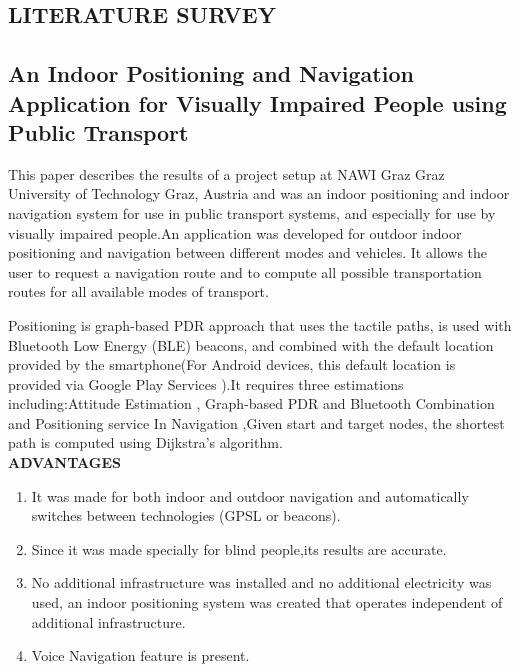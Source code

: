 ﻿\documentclass[a4paper, 12pt]{article}
\begin{document}
\begin{center}

\section{LITERATURE SURVEY}

\end{center}



\subsection{An Indoor Positioning and Navigation Application for Visually Impaired People using Public Transport}
\hspace{1cm}This paper describes the results of a project setup at NAWI Graz Graz University of Technology Graz, Austria  and was an indoor positioning and indoor navigation system for use in public transport systems, and especially for use by visually impaired people.An application was developed for outdoor indoor positioning and navigation between different modes and vehicles. It allows the user to request a navigation route and to compute all possible transportation routes for all available modes of transport.
\par Positioning is graph-based PDR approach that uses the tactile paths, is used with Bluetooth Low Energy (BLE) beacons, and combined with the default location provided by the smartphone(For Android devices, this default location is provided via Google Play Services ).It requires three estimations including:Attitude Estimation , Graph-based PDR and Bluetooth Combination and Positioning service 
In Navigation ,Given start and target nodes, the shortest path is computed using Dijkstra’s algorithm.
\\
\linebreak
\textbf{ADVANTAGES}
\begin{enumerate}
	\item It was made for both indoor and outdoor navigation and automatically switches between technologies (GPSL or beacons).
	\item	Since it was made specially for blind people,its results are accurate. 
	\item	No additional infrastructure was installed and no additional electricity was used, an indoor positioning system was created that operates independent of additional infrastructure.
	\item Voice Navigation feature is present.
	
\end{enumerate}
\end{document}
